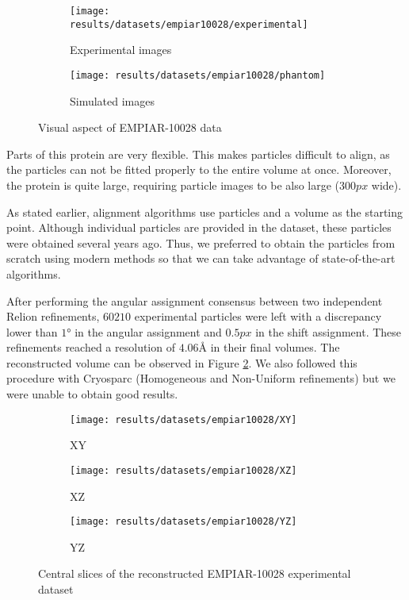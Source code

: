 \documentclass[../main.tex]{subfiles}
\begin{document}
\begin{figure}[htbp]
    \centering
    \begin{subfigure}[b]{0.45\textwidth}
         \centering
         \texttt{[image: results/datasets/empiar10028/experimental]}
         \caption{Experimental images}
    \end{subfigure}
    \hfill
    \begin{subfigure}[b]{0.45\textwidth}
         \centering
         \texttt{[image: results/datasets/empiar10028/phantom]}
         \caption{Simulated images}
    \end{subfigure}
    \caption{Visual aspect of EMPIAR-10028 data}
    \label{fig:5:empiar10028}
\end{figure}

Parts of this protein are very flexible. This makes particles difficult to align, as the particles can not be fitted properly to the entire volume at once. Moreover, the protein is quite large, requiring particle images to be also large ($300 \si{px}$ wide).

As stated earlier, alignment algorithms use particles and a volume as the starting point. Although individual particles are provided in the dataset, these particles were obtained several years ago. Thus, we preferred to obtain the particles from scratch using modern methods so that we can take advantage of state-of-the-art algorithms.

After performing the angular assignment consensus between two independent Relion refinements, $60210$ experimental particles were left with a discrepancy lower than $1 \si{\degree}$ in the angular assignment and $0.5 \si{px}$ in the shift assignment. These refinements reached a resolution of $4.06 \si{\angstrom}$ in their final volumes. The reconstructed volume can be observed in Figure \ref{fig:5:empiar10028_rec}. We also followed this procedure with Cryosparc (Homogeneous and Non-Uniform refinements) but we were unable to obtain good results.

\begin{figure}[htbp]
    \centering
    \begin{subfigure}[b]{0.3\textwidth}
         \centering
         \texttt{[image: results/datasets/empiar10028/XY]}
         \caption{XY}
    \end{subfigure}
    \hfill
    \begin{subfigure}[b]{0.3\textwidth}
         \centering
         \texttt{[image: results/datasets/empiar10028/XZ]}
         \caption{XZ}
    \end{subfigure}
    \hfill
    \begin{subfigure}[b]{0.3\textwidth}
         \centering
         \texttt{[image: results/datasets/empiar10028/YZ]}
         \caption{YZ}
    \end{subfigure}

    \caption{Central slices of the reconstructed EMPIAR-10028 experimental dataset}
    \label{fig:5:empiar10028_rec}
\end{figure}
\end{document}
